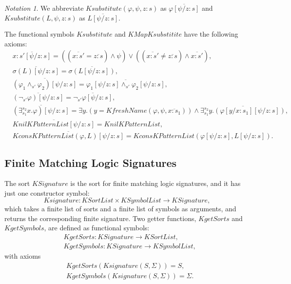 \documentclass[UTF8,11pt]{article}
\newcounter{thmcounter}
\theoremstyle{plain}
\theoremstyle{definition}
\theoremstyle{remark}
\newtheorem{notation}   [thmcounter]{Notation}
\newcommand{\cln}{{:}}
\newcommand{\KnilKPatternList}{\mathit{KnilKPatternList}}
\newcommand{\KconsKPatternList}{\mathit{KconsKPatternList}}
\newcommand{\KSortList}{\mathit{KSortList}}
\newcommand{\KSymbolList}{\mathit{KSymbolList}}
\newcommand{\KfreshName}{\mathit{KfreshName}}
\newcommand{\KSignature}{\mathit{KSignature}}
\newcommand{\Ksignature}{\mathit{Ksignature}}
\newcommand{\KgetSorts}{\mathit{KgetSorts}}
\newcommand{\KgetSymbols}{\mathit{KgetSymbols}}
\newcommand{\Ksubstitute}{\mathit{Ksubstitute}}
\newcommand{\KMapKsubstitite}{\mathit{KMapKsubstitite}}
\begin{document}
\begin{notation}
	We abbreviate $\Ksubstitute(\varphi, \psi, z \cln s)$ as 
	$\overline{\varphi[\psi / z \cln s]}$ and $\Ksubstitute(L, \psi, z \cln s)$ as $\overline{L[\psi / z \cln s]}$.
\end{notation}

The functional symbols $\Ksubstitute$ and $\KMapKsubstitite$ have the following axioms:
\begin{align*}
  & \overline{x \cln s' [\psi / z \cln s]} = ((\overline{x \cln s'} = \overline{z \cln s}) \wedge \psi) \vee ((\overline{x \cln s'} \neq \overline{z \cln s}) \wedge \overline{x \cln s'}),
  \\
  & \overline{\sigma(L) [\psi / z \cln s]} = \overline{\sigma(L[\psi / z \cln s])},
  \\
  & \overline{(\varphi_1 \wedge_{s'} \varphi_2) [\psi / z \cln s]} = \overline{\varphi_1[\psi / z \cln s] \wedge_{s'} \varphi_2[\psi / z \cln s]},
  \\
  & \overline{(\neg_{s'} \varphi)[\psi / z \cln s]} = \overline{\neg_{s'} \varphi[\psi / z \cln s]},
  \\
  & \overline{(\exists_{s_1}^{s_2}x . \varphi)[\psi/z \cln s]} = \exists y . (y = \KfreshName(\varphi, \psi, \overline{x \cln s_1})) \wedge \overline{\exists_{s_1}^{s_2} y . (\varphi[y/x \cln s_1][\psi/z \cln s])},
  \\
  & \overline{\KnilKPatternList[\psi / z \cln s]} = \KnilKPatternList,
  \\
  & \overline{\KconsKPatternList(\varphi, L)[\psi / z \cln s]} = \KconsKPatternList(\varphi[\psi / z \cln s], L[\psi / z \cln s]).
\end{align*}

\subsection{Finite Matching Logic Signatures}

The sort $\KSignature$ is the sort for finite matching logic signatures, and it has just one constructor symbol:
\begin{equation*}
\Ksignature \colon \KSortList \times \KSymbolList \to \KSignature,
\end{equation*}
which takes a finite list of sorts and a finite list of symbols as arguments, and returns the corresponding finite signature.
Two getter functions, $\KgetSorts$ and $\KgetSymbols$, are defined as functional symbols:
\begin{align*}
  & \KgetSorts \colon \KSignature \to \KSortList,
  \\
  & \KgetSymbols \colon \KSignature \to \KSymbolList,
\end{align*}
with axioms
\begin{align*}
  & \KgetSorts(\Ksignature(S, \Sigma)) = S,
  \\
  & \KgetSymbols(\Ksignature(S, \Sigma)) = \Sigma.
\end{align*}
\end{document}
